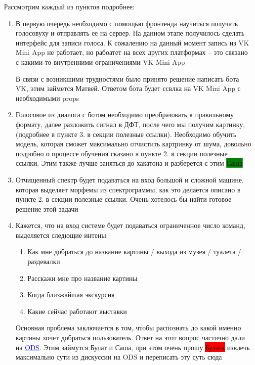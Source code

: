 \documentclass[11pt]{article}
\begin{document}
Рассмотрим каждый из пунктов подробнее:
\begin{enumerate}
\item В первую очередь необходимо с помощью фронтенда научиться получать голосовуху и отправлять ее на сервер. На данном этапе получилось сделать интерфейс для записи голоса. К сожалению на данный момент запись из VK Mini App не работает, но рабоатет на всех других платформах -- это связано с какими-то внутренними ограничениями VK Mini App

В связи с возникшими трудностями было принято решение написать бота VK, этим займется Матвей.  Ответом бота будет ссвлка на VK Mini App с необходимыми props

\item Голосовое из диалога с ботом необходимо преобразовать к правильному формату, далее разложить сигнал в ДФТ, после чего мы получим картинку, (подробнее в пункте 3. в секции полезные ссылки). Необходимо обучить модель, которая сможет максимально отчистить картринку от шума, довольно подробно о процессе обучения сказано в пункте 2. в секции полезные ссылки. Этим также лучше заняться до хакатона и разберется с этим  \colorbox{green}{Саша}

\item Отчищенный спектр будет подаваться на вход большой и сложной машине, которая выделяет морфемы из спектрограммы, как это делается описано в пункте 2. в секции полезные ссылки. Очень хотелось бы найти готовое решение этой задачи

\item Кажется, что на вход системе будет подаваться ограниченное число команд, выделяется следющие интены:\begin{enumerate}
\item Как мне добраться до название картины / выхода из музея / туалета / раздевалки
\item Расскажи мне про название картины
\item Когда близжайшая экскурсия
\item Какие сейчас работают выставки 
\end{enumerate}

Основная проблема заключается в том, чтобы распознать до какой именно картины хочет добраться пользователь. Ответ на этот вопрос частично дали на \href{https://opendatascience.slack.com/archives/C04N3UMSL/p1568308189002800}{\textcolor{blue}{ODS}}. Этим займутся Булат и Саша, при этом очень прошу \colorbox{red}{Булата} извлечь максимально сути из дискуссии на ODS и переписать эту суть сюда


\end{enumerate}
\end{document}
